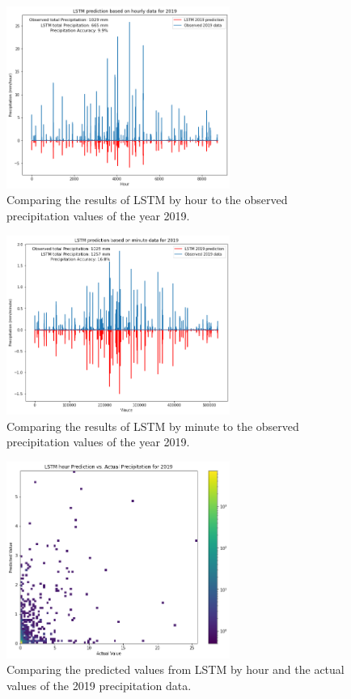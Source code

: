 \documentclass[11pt]{report}
\begin{document}
\begin{figure}[th!]
	\centering
	\includegraphics[width = 0.65\textwidth]{Figures/LSTM_hour.png}
	\caption[Comparing LSTM results to observed precipitation in 2019 by hour]{\label{LSTM_hour} Comparing the results of LSTM by hour to the observed
		 precipitation values of the year 2019.
	}
\end{figure}

\begin{figure}[bh!]
	\centering
	\includegraphics[width = 0.65\textwidth]{Figures/LSTM_minute.png}
	\caption[Comparing LSTM results to observed precipitation in 2019 by minute]{\label{LSTM_minute}
		Comparing the results of LSTM by minute to the observed
		precipitation values of the year 2019.
	}
\end{figure}
\clearpage
\begin{figure}[th!]
	\centering
	\includegraphics[width = 0.65\textwidth]{Figures/LSTM_hour_compare.png}
	\caption[\label{LSTM_hour_compare}LSTM hour prediction vs. actual data]{
		Comparing the predicted values from LSTM by hour and the actual values of the 2019 precipitation data.
	}
\end{figure}
\end{document}
